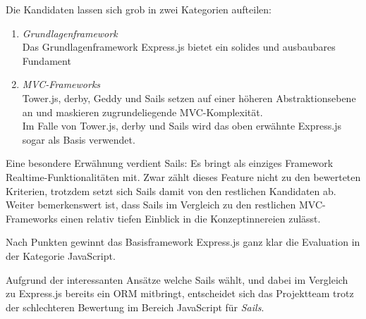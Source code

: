 Die Kandidaten lassen sich grob in zwei Kategorien aufteilen:

\begin{enumerate}
	\item \emph{Grundlagenframework} \\
	Das Grundlagenframework Express.js bietet ein solides und ausbaubares Fundament
	\item \emph{MVC-Frameworks} \\
	Tower.js, derby, Geddy und Sails setzen auf einer höheren Abstraktionsebene an und maskieren zugrundeliegende MVC-Komplexität. \\ Im Falle von Tower.js, derby und Sails wird das oben erwähnte Express.js sogar als Basis verwendet.
\end{enumerate}

Eine besondere Erwähnung verdient Sails: Es bringt als einziges Framework \gls{Realtime}-Funktionalitäten mit. Zwar zählt dieses Feature nicht zu den bewerteten Kriterien, trotzdem setzt sich Sails damit von den restlichen Kandidaten ab. Weiter bemerkenswert ist, dass Sails im Vergleich zu den restlichen MVC-Frameworks einen relativ tiefen Einblick in die Konzeptinnereien zulässt.

Nach Punkten gewinnt das Basisframework Express.js ganz klar die Evaluation in der Kategorie JavaScript.

Aufgrund der interessanten Ansätze welche Sails wählt, und dabei im Vergleich zu Express.js bereits ein \gls{ORM} mitbringt, entscheidet sich das Projektteam trotz der schlechteren Bewertung im Bereich JavaScript für \emph{Sails}.
